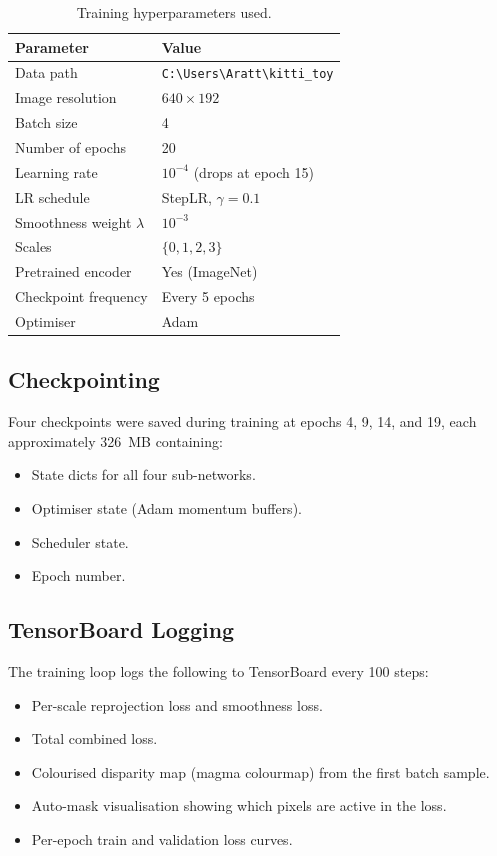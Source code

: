 \documentclass[10pt, a4paper, twocolumn]{article}
\begin{document}
\begin{table}[H]
\centering
\caption{Training hyperparameters used.}
\label{tab:hyperparams}
\begin{tabular}{@{}ll@{}}
\toprule
\textbf{Parameter} & \textbf{Value} \\
\midrule
Data path & \texttt{C:\textbackslash Users\textbackslash Aratt\textbackslash kitti\_toy} \\
Image resolution & $640 \times 192$ \\
Batch size & 4 \\
Number of epochs & 20 \\
Learning rate & $10^{-4}$ (drops at epoch 15) \\
LR schedule & StepLR, $\gamma = 0.1$ \\
Smoothness weight $\lambda$ & $10^{-3}$ \\
Scales & $\{0, 1, 2, 3\}$ \\
Pretrained encoder & Yes (ImageNet) \\
Checkpoint frequency & Every 5 epochs \\
Optimiser & Adam \\
\bottomrule
\end{tabular}
\end{table}

\subsection{Checkpointing}

Four checkpoints were saved during training at epochs 4, 9, 14, and 19, each approximately 326~MB containing:
\begin{itemize}[noitemsep]
    \item State dicts for all four sub-networks.
    \item Optimiser state (Adam momentum buffers).
    \item Scheduler state.
    \item Epoch number.
\end{itemize}

\subsection{TensorBoard Logging}

The training loop logs the following to TensorBoard every 100 steps:
\begin{itemize}[noitemsep]
    \item Per-scale reprojection loss and smoothness loss.
    \item Total combined loss.
    \item Colourised disparity map (magma colourmap) from the first batch sample.
    \item Auto-mask visualisation showing which pixels are active in the loss.
    \item Per-epoch train and validation loss curves.
\end{itemize}
\end{document}
